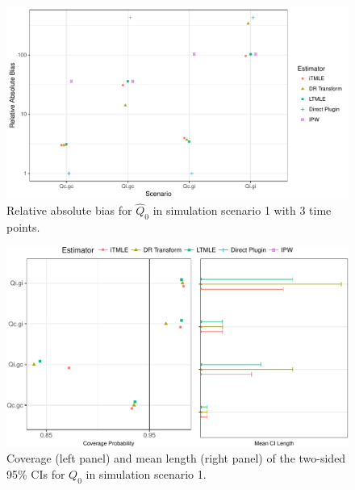 \documentclass{article}\usepackage[]{graphicx}\usepackage[]{color}
\newenvironment{knitrout}{}{} %
\begin{document}
\begin{knitrout}
\color{fgcolor}\begin{figure}[H]

{\centering \includegraphics[width=.7\linewidth]{figure/plot-ggplot_bias_t3-1} 

}

\caption[Relative absolute bias for $\hat{Q}_0$ in simulation scenario 1 with 3 time points]{Relative absolute bias for $\hat{Q}_0$ in simulation scenario 1 with 3 time points.}\label{fig:ggplot.bias.t3}
\end{figure}


\end{knitrout}

\begin{knitrout}
\color{fgcolor}\begin{figure}[H]

{\centering \includegraphics[width=.9\linewidth]{figure/plot-ggplot_CIcov_CIlen_t3-1} 

}

\caption[Coverage (left panel) and mean length (right panel) of the two-sided 95\% CIs for $Q_0$ in simulation scenario 1]{Coverage (left panel) and mean length (right panel) of the two-sided 95\% CIs for $Q_0$ in simulation scenario 1.}\label{fig:ggplot.CIcov.CIlen.t3}
\end{figure}


\end{knitrout}
\end{document}
